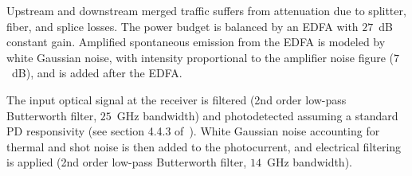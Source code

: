 \documentclass[12pt,twoside,openright]{moddalthesis}
\begin{document}
Upstream and downstream merged traffic suffers from attenuation due to
splitter, fiber, and
splice losses. The power budget is balanced by an EDFA with $27$~dB constant gain.
Amplified spontaneous emission from the EDFA is modeled by white Gaussian
noise, with intensity proportional to the amplifier noise figure ($7$~dB), and is added
after the EDFA. 


The input optical signal at the receiver is filtered (2nd order low-pass Butterworth filter, $25$~GHz bandwidth) and photodetected assuming a standard PD responsivity (see section 4.4.3 of~\cite{Agrawal:xx}).
White Gaussian noise accounting for thermal and shot noise is then added
to the photocurrent, and 
electrical filtering is applied (2nd order low-pass Butterworth filter, $14$~GHz bandwidth).
\end{document}
